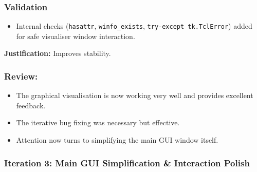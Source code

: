 \subsubsection{Validation}
\begin{itemize}
	\item Internal checks (\verb|hasattr|, \verb|winfo_exists|, \verb|try-except tk.TclError|) added for safe visualiser window interaction.
\end{itemize}
\textbf{Justification:} Improves stability.

\subsubsection{Review:}
\begin{itemize}
	\item The graphical visualisation is now working very well and provides excellent feedback.
	\item The iterative bug fixing was necessary but effective.
	\item Attention now turns to simplifying the main GUI window itself.
\end{itemize}

\subsubsection{Iteration 3: Main GUI Simplification \& Interaction Polish}

